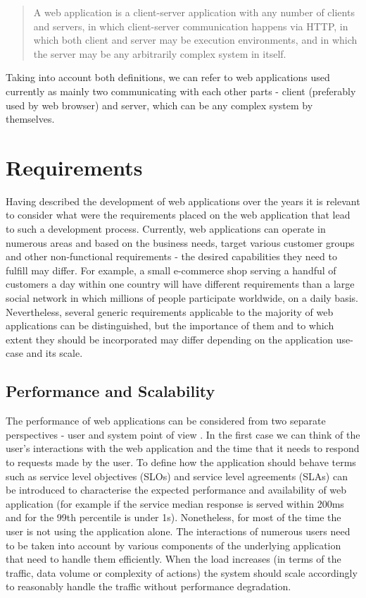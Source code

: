 \begin{quotation}
A web application is a client-server application with any number of clients and servers, in which client-server communication happens via HTTP, in which both client and server may be execution environments, and in which the server may be any arbitrarily complex system in itself.
\end{quotation}

Taking into account both definitions, we can refer to web applications used currently as mainly two communicating with each other parts - client (preferably used by web browser) and server, which can be any complex system by themselves.

\section{Requirements}

Having described the development of web applications over the years it is relevant to consider what were the requirements placed on the web application that lead to such a development process. Currently, web applications can operate in numerous areas and based on the business needs, target various customer groups and other non-functional requirements - the desired capabilities they need to fulfill may differ. For example, a small e-commerce shop serving a handful of customers a day within one country will have different requirements than a large social network in which millions of people participate worldwide, on a daily basis. Nevertheless, several generic requirements applicable to the majority of web applications can be distinguished, but the importance of them and to which extent they should be incorporated may differ depending on the application use-case and its scale.

\subsection*{Performance and Scalability}

The performance of web applications can be considered from two separate perspectives - user and system point of view \cite{DesignDataIntensiveApplications}. In the first case we can think of the user's interactions with the web application and the time that it needs to respond to requests made by the user. To define how the application should behave terms such as service level objectives (SLOs) and service level agreements (SLAs) can be introduced to characterise the expected performance and availability of web application (for example if the service median response is served within 200ms and for the 99th percentile is under 1s). Nonetheless, for most of the time the user is not using the application alone. The interactions of numerous users need to be taken into account by various components of the underlying application that need to handle them efficiently. When the load increases (in terms of the traffic, data volume or complexity of actions) the system should scale accordingly to reasonably handle the traffic without performance degradation. 

